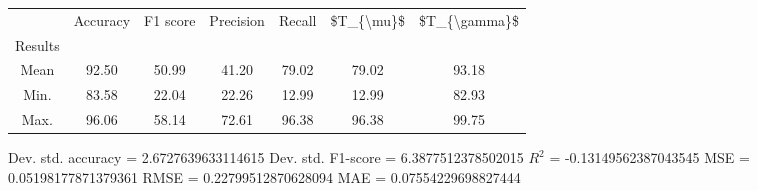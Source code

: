 \begin{tabular}{|c|c|c|c|c|c|c|}
\toprule
{} &  Accuracy &  F1 score &  Precision &  Recall &  \$T\_\{\textbackslash mu\}\$ &  \$T\_\{\textbackslash gamma\}\$ \\
Results &           &           &            &         &            &               \\
\hline
Mean    &     92.50 &     50.99 &      41.20 &   79.02 &      79.02 &         93.18 \\
Min.    &     83.58 &     22.04 &      22.26 &   12.99 &      12.99 &         82.93 \\
Max.    &     96.06 &     58.14 &      72.61 &   96.38 &      96.38 &         99.75 \\
\bottomrule
\end{tabular}

 Dev. std. accuracy = 2.6727639633114615
 Dev. std. F1-score = 6.3877512378502015
 $R^2$ = -0.13149562387043545
 MSE = 0.05198177871379361
 RMSE = 0.22799512870628094
 MAE = 0.07554229698827444